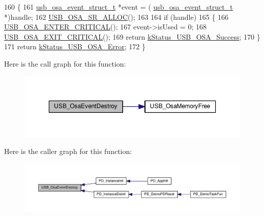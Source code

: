 \begin{DoxyCode}
160 \{
161     \hyperlink{struct__usb__osa__event__struct}{usb\_osa\_event\_struct\_t} *\textcolor{keyword}{event} = (
      \hyperlink{struct__usb__osa__event__struct}{usb\_osa\_event\_struct\_t} *)handle;
162     \hyperlink{usb__osa__bm_8h_a8dbccf46cc2f8e3b5cece6a4a84f7ae8}{USB\_OSA\_SR\_ALLOC}();
163 
164     \textcolor{keywordflow}{if} (handle)
165     \{
166         \hyperlink{usb__osa__bm_8h_a0485f70bf9c9a22f0340f014bc567362}{USB\_OSA\_ENTER\_CRITICAL}();
167         \textcolor{keyword}{event}->isUsed = 0;
168         \hyperlink{usb__osa__bm_8h_a5b8053eca19b6df666a26fad3b07f953}{USB\_OSA\_EXIT\_CRITICAL}();
169         \textcolor{keywordflow}{return} \hyperlink{group__usb__os__abstraction_gga453ebd2f93aafb8c938c3a23c815f9bdab90805fb75297fda1ca60dbb2283f933}{kStatus\_USB\_OSA\_Success};
170     \}
171     \textcolor{keywordflow}{return} \hyperlink{group__usb__os__abstraction_gga453ebd2f93aafb8c938c3a23c815f9bda40b794ea06e27b8ec1d67538f12eb350}{kStatus\_USB\_OSA\_Error};
172 \}
\end{DoxyCode}


Here is the call graph for this function\-:
\nopagebreak
\begin{figure}[H]
\begin{center}
\leavevmode
\includegraphics[width=350pt]{group__usb__os__abstraction_ga3d07a809b1fa8450c1383aa8bbd49b37_cgraph}
\end{center}
\end{figure}




Here is the caller graph for this function\-:
\nopagebreak
\begin{figure}[H]
\begin{center}
\leavevmode
\includegraphics[width=350pt]{group__usb__os__abstraction_ga3d07a809b1fa8450c1383aa8bbd49b37_icgraph}
\end{center}
\end{figure}


